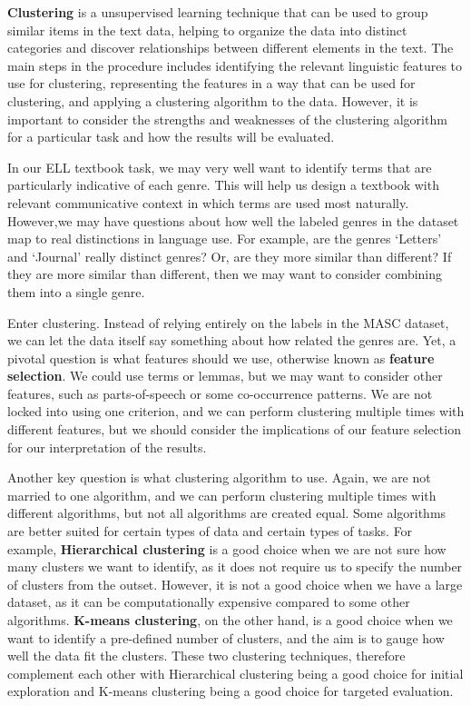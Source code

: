 \documentclass[
  letterpaper,
  DIV=11,
  numbers=noendperiod]{scrreport}
\theoremstyle{definition}
\theoremstyle{remark}
\begin{document}
\textbf{Clustering} is a unsupervised learning technique that can be
used to group similar items in the text data, helping to organize the
data into distinct categories and discover relationships between
different elements in the text. The main steps in the procedure includes
identifying the relevant linguistic features to use for clustering,
representing the features in a way that can be used for clustering, and
applying a clustering algorithm to the data. However, it is important to
consider the strengths and weaknesses of the clustering algorithm for a
particular task and how the results will be evaluated.

In our ELL textbook task, we may very well want to identify terms that
are particularly indicative of each genre. This will help us design a
textbook with relevant communicative context in which terms are used
most naturally. However,we may have questions about how well the labeled
genres in the dataset map to real distinctions in language use. For
example, are the genres `Letters' and `Journal' really distinct genres?
Or, are they more similar than different? If they are more similar than
different, then we may want to consider combining them into a single
genre.

Enter clustering. Instead of relying entirely on the labels in the MASC
dataset, we can let the data itself say something about how related the
genres are. Yet, a pivotal question is what features should we use,
otherwise known as \textbf{feature selection}. We could use terms or
lemmas, but we may want to consider other features, such as
parts-of-speech or some co-occurrence patterns. We are not locked into
using one criterion, and we can perform clustering multiple times with
different features, but we should consider the implications of our
feature selection for our interpretation of the results.

Another key question is what clustering algorithm to use. Again, we are
not married to one algorithm, and we can perform clustering multiple
times with different algorithms, but not all algorithms are created
equal. Some algorithms are better suited for certain types of data and
certain types of tasks. For example, \textbf{Hierarchical clustering} is
a good choice when we are not sure how many clusters we want to
identify, as it does not require us to specify the number of clusters
from the outset. However, it is not a good choice when we have a large
dataset, as it can be computationally expensive compared to some other
algorithms. \textbf{K-means clustering}, on the other hand, is a good
choice when we want to identify a pre-defined number of clusters, and
the aim is to gauge how well the data fit the clusters. These two
clustering techniques, therefore complement each other with Hierarchical
clustering being a good choice for initial exploration and K-means
clustering being a good choice for targeted evaluation.
\end{document}
